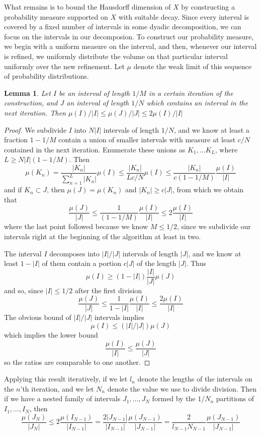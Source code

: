 \documentclass{report}
\theoremstyle{plain}
\newtheorem{lemma}{Lemma}
\theoremstyle{plain}
\begin{document}
What remains is to bound the Hausdorff dimension of $X$ by constructing a probability measure supported on $X$ with suitable decay. Since every interval is covered by a fixed number of intervals in some dyadic decomposition, we can focus on the intervals in our decomposion. To construct our probability measure, we begin with a uniform measure on the interval, and then, whenever our interval is refined, we uniformly distribute the volume on that particular interval uniformly over the new refinement. Let $\mu$ denote the weak limit of this sequence of probability distributions.

\begin{lemma}
    Let $I$ be an interval of length $1/M$ in a certain iteration of the construction, and $J$ an interval of length $1/N$ which contains an interval in the next iteration. Then $\mu(I)/|I| \leq \mu(J)/|J| \leq 2 \mu(I)/|I|$
\end{lemma}
\begin{proof}
    We subdivide $I$ into $N |I|$ intervals of length $1/N$, and we know at least a fraction $1 - 1/M$ contain a union of smaller intervals with measure at least $c/N$ contained in the next iteration. Enumerate these unions as $K_1, \dots K_L$, where $L \geq N|I|(1 - 1/M)$. Then
    \[ \mu(K_n) = \frac{|K_n|}{\sum_{n = 1}^L |K_n|} \mu(I) \leq \frac{|K_n|}{Lc/N} \mu(I) \leq \frac{|K_n|}{c(1 - 1/M)} \frac{\mu(I)}{|I|} \]
    and if $K_n \subset J$, then $\mu(J) = \mu(K_n)$ and $|K_n| \geq c|J|$, from which we obtain that
    \[ \frac{\mu(J)}{|J|} \leq \frac{1}{(1 - 1/M)} \frac{\mu(I)}{|I|} \leq 2 \frac{\mu(I)}{|I|} \]
    where the last point followed because we know $M \leq 1/2$, since we subdivide our intervals right at the beginning of the algorithm at least in two.

    The interval $I$ decomposes into $|I|/|J|$ intervals of length $|J|$, and we know at least $1 - |I|$ of them contain a portion $c|J|$ of the length $|J|$. Thus
    \[ \mu(I) \geq (1 - |I|) \frac{|I|}{|J|} \mu(J) \]
    and so, since $|I| \leq 1/2$ after the first division
    \[ \frac{\mu(J)}{|J|} \leq \frac{1}{1 - |I|} \frac{\mu(I)}{|I|} \leq \frac{2 \mu(I)}{|I|} \]
    The obvious bound of $|I|/|J|$ intervals implies
    \[ \mu(I) \leq (|I|/|J|) \mu(J) \]
    which implies the lower bound
    \[ \frac{\mu(I)}{|I|} \leq \frac{\mu(J)}{|J|} \]
    so the ratios are comparable to one another.
\end{proof}

Applying this result iteratively, if we let $l_n$ denote the lengths of the intervals on the $n$'th iteration, and we let $N_n$ denote the value we use to divide division. Then if we have a nested family of intervals $J_1, \dots, J_N$ formed by the $1/N_n$ partitions of $I_1, \dots, I_N$, then
%
\[ \frac{\mu(J_N)}{|J_N|} \leq 2 \frac{\mu(I_{N-1})}{|I_{N-1}|} = \frac{2|J_{N-1}|}{|I_{N-1}|} \frac{\mu(J_{N-1})}{|J_{N-1}|} = \frac{2}{l_{N-1} N_{N-1}} \frac{\mu(J_{N-1})}{|J_{N-1}|} \]
\end{document}
